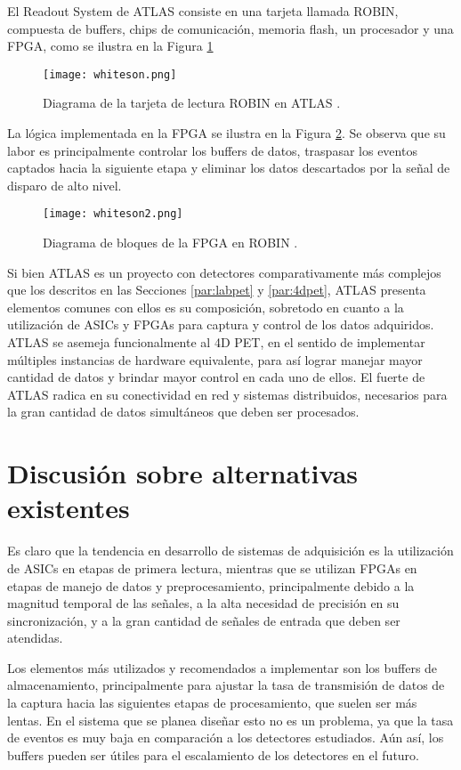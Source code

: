 	El Readout System de ATLAS consiste en una tarjeta llamada ROBIN, compuesta de buffers, chips de comunicación, memoria flash, un procesador y una FPGA, como se ilustra en la Figura \ref{fig:whiteson}
	
	\begin{figure}[h]
		\centering
		\texttt{[image: whiteson.png]}
		\caption{Diagrama de la tarjeta de lectura ROBIN en ATLAS \cite{Whiteson2016TheSystem}.}
		\label{fig:whiteson}
	\end{figure}
	
	La lógica implementada en la FPGA se ilustra en la Figura \ref{fig:whiteson2}. Se observa que su labor es principalmente controlar los buffers de datos, traspasar los eventos captados hacia la siguiente etapa y eliminar los datos descartados por la señal de disparo de alto nivel.
	
	\begin{figure}[h]
		\centering
		\texttt{[image: whiteson2.png]}
		\caption{Diagrama de bloques de la FPGA en ROBIN \cite{Whiteson2016TheSystem}.}
		\label{fig:whiteson2}
	\end{figure}
	
	\newpage
	Si bien ATLAS es un proyecto con detectores comparativamente más complejos que los descritos en las Secciones \ref{par:labpet} y \ref{par:4dpet}, ATLAS presenta elementos comunes con ellos es su composición, sobretodo en cuanto a la utilización de ASICs y FPGAs para captura y control de los datos adquiridos. ATLAS se asemeja funcionalmente al 4D PET, en el sentido de implementar múltiples instancias de hardware equivalente, para así lograr manejar mayor cantidad de datos y brindar mayor control en cada uno de ellos. El fuerte de ATLAS radica en su conectividad en red y sistemas distribuidos, necesarios para la gran cantidad de datos simultáneos que deben ser procesados.


\section{Discusión sobre alternativas existentes}
	Es claro que la tendencia en desarrollo de sistemas de adquisición es la utilización de ASICs en etapas de primera lectura, mientras que se utilizan FPGAs en etapas de manejo de datos y preprocesamiento, principalmente debido a la magnitud temporal de las señales, a la alta necesidad de precisión en su sincronización, y a la gran cantidad de señales de entrada que deben ser atendidas.
	
	Los elementos más utilizados y recomendados a implementar son los buffers de almacenamiento, principalmente para ajustar la tasa de transmisión de datos de la captura hacia las siguientes etapas de procesamiento, que suelen ser más lentas. En el sistema que se planea diseñar esto no es un problema, ya que la tasa de eventos es muy baja en comparación a los detectores estudiados. Aún así, los buffers pueden ser útiles para el escalamiento de los detectores en el futuro.
	
